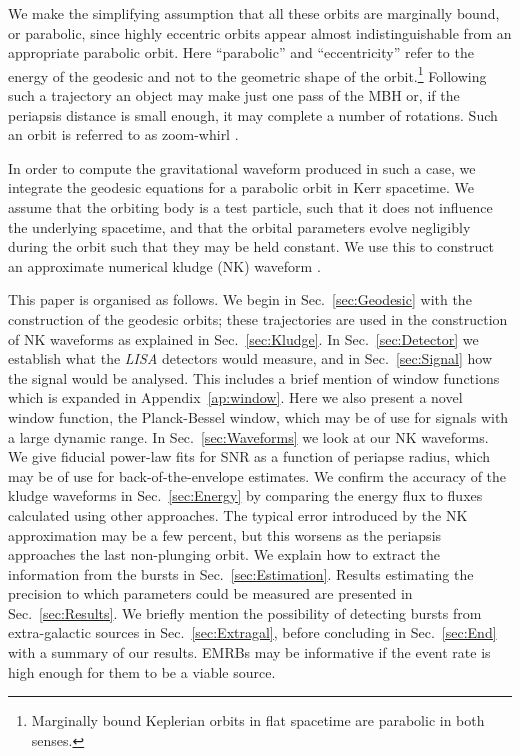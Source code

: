\documentclass[useAMS,usedcolumn,usegraphicx,usenatbib]{mn2e}
\newcommand{\secref}[1]{Sec.~\ref{sec:#1}}
\newcommand{\apref}[1]{Appendix~\ref{ap:#1}}
\begin{document}
We make the simplifying assumption that all these orbits are marginally bound, or parabolic, since highly eccentric orbits appear almost indistinguishable from an appropriate parabolic orbit. Here ``parabolic'' and ``eccentricity'' refer to the energy of the geodesic and not to the geometric shape of the orbit.\footnote{Marginally bound Keplerian orbits in flat spacetime are parabolic in both senses.} Following such a trajectory an object may make just one pass of the MBH or, if the periapsis distance is small enough, it may complete a number of rotations. Such an orbit is referred to as zoom-whirl \citep{Glampedakis2002a}.

In order to compute the gravitational waveform produced in such a case, we integrate the geodesic equations for a parabolic orbit in Kerr spacetime. We assume that the orbiting body is a test particle, such that it does not influence the underlying spacetime, and that the orbital parameters evolve negligibly during the orbit such that they may be held constant. We use this to construct an approximate numerical kludge (NK) waveform \citep{Babak2007}.

This paper is organised as follows. We begin in \secref{Geodesic} with the construction of the geodesic orbits; these trajectories are used in the construction of NK waveforms as explained in \secref{Kludge}. In \secref{Detector} we establish what the \textit{LISA} detectors would measure, and in \secref{Signal} how the signal would be analysed. This includes a brief mention of window functions which is expanded in \apref{window}. Here we also present a novel window function, the Planck-Bessel window, which may be of use for signals with a large dynamic range. In \secref{Waveforms} we look at our NK waveforms. We give fiducial power-law fits for SNR as a function of periapse radius, which may be of use for back-of-the-envelope estimates. We confirm the accuracy of the kludge waveforms in \secref{Energy} by comparing the energy flux to fluxes calculated using other approaches. The typical error introduced by the NK approximation may be a few percent, but this worsens as the periapsis approaches the last non-plunging orbit. We explain how to extract the information from the bursts in \secref{Estimation}. Results estimating the precision to which parameters could be measured are presented in \secref{Results}. We briefly mention the possibility of detecting bursts from extra-galactic sources in \secref{Extragal}, before concluding in \secref{End} with a summary of our results. EMRBs may be informative if the event rate is high enough for them to be a viable source.
\end{document}
